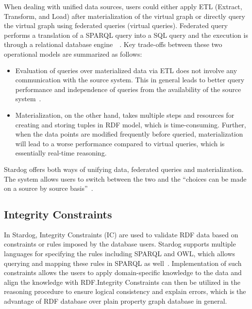 When dealing with unified data sources, users could either apply ETL 
(Extract, Transform, and Load) after materialization of the virtual graph or 
directly query the virtual graph using federated queries (virtual queries). 
Federated query performs a translation of a SPARQL query into a SQL query 
and the execution is through a relational database 
engine~\cite{hid-sp18-405-blog-stardog-virtual2}~\cite{hid-sp18-405-diego2017ontop-stardog}.
 Key trade-offs between these two operational models are summarized as 
 follows:
 \begin{itemize}
	\item Evaluation of queries over materialized data via ETL does not involve 
	any communication with the source system. This in general leads to better 
	query performance and independence of queries from the availability of 
	the source system~\cite{hid-sp18-405-blog-stardog-virtual}.
	\item Materialization, on the other hand, takes multiple steps and 
	resources for creating and storing tuples in RDF model, which is 
	time-consuming. Further, when the data points are modified frequently 
	before queried, materialization will lead to a worse performance compared 
	to virtual queries, which is essentially real-time reasoning.
\end{itemize}
Stardog offers both ways of unifying data, federated queries and 
materialization. The system allows users to switch between the two and the 
``choices can be made on a source by source 
basis''~\cite{hid-sp18-405-blog-stardog-virtual}.

\subsection{Integrity Constraints}
In Stardog, Integrity Constraints (IC) are used to validate RDF data based on 
constraints or rules imposed by the database users. Stardog supports 
multiple languages for specifying the rules including SPARQL and OWL, 
which allows querying and mapping these rules in SPARQL as 
well~\cite{hid-sp18-405-www-stardog-docs}. Implementation of such 
constraints allows the users to apply domain-specific knowledge to the data 
and align the knowledge with RDF.\@ Integrity Constraints can then be 
utilized in the reasoning procedure to ensure logical consistency and explain 
errors, which is the advantage of RDF database over plain property graph 
database in general. 

